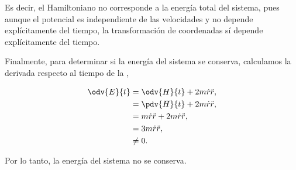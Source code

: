 \documentclass[../main.tex]{subfiles}
\begin{document}
\begin{problema}
	Es decir, el Hamiltoniano no corresponde a la energía total
	del sistema, pues aunque el potencial es independiente de las velocidades y
	no depende explícitamente del tiempo, la transformación de coordenadas sí depende
	explícitamente del tiempo.

	Finalmente, para determinar si la energía del sistema se conserva,
	calculamos la derivada respecto al tiempo de la ,

	\begin{align*}
		\odv{E}{t} & = \odv{H}{t} + 2m \dot{r} \ddot{r},\nonumber \\
		           & = \pdv{H}{t} + 2m \dot{r} \ddot{r},          \\
		           & = m \dot{r} \ddot{r} + 2m \dot{r} \ddot{r},  \\
		           & = 3m \dot{r}\ddot{r},                        \\
		           & \neq 0.
	\end{align*}

	Por lo tanto, la energía del sistema no se conserva.
\end{problema}
\end{document}
